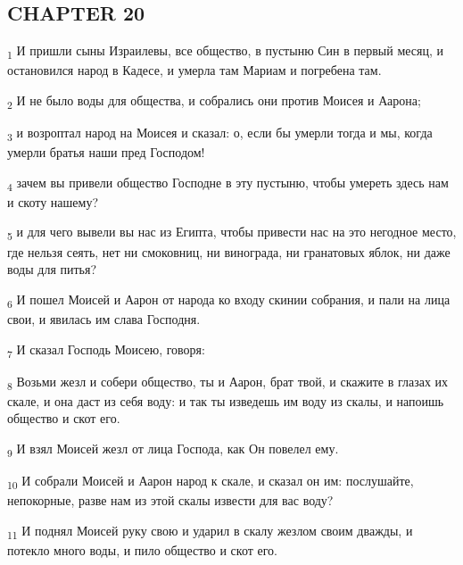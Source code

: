\subsection{CHAPTER 20}
\begin{tcolorbox}
\textsubscript{1} И пришли сыны Израилевы, все общество, в пустыню Син в первый месяц, и остановился народ в Кадесе, и умерла там Мариам и погребена там.
\end{tcolorbox}
\begin{tcolorbox}
\textsubscript{2} И не было воды для общества, и собрались они против Моисея и Аарона;
\end{tcolorbox}
\begin{tcolorbox}
\textsubscript{3} и возроптал народ на Моисея и сказал: о, если бы умерли тогда и мы, когда умерли братья наши пред Господом!
\end{tcolorbox}
\begin{tcolorbox}
\textsubscript{4} зачем вы привели общество Господне в эту пустыню, чтобы умереть здесь нам и скоту нашему?
\end{tcolorbox}
\begin{tcolorbox}
\textsubscript{5} и для чего вывели вы нас из Египта, чтобы привести нас на это негодное место, где нельзя сеять, нет ни смоковниц, ни винограда, ни гранатовых яблок, ни даже воды для питья?
\end{tcolorbox}
\begin{tcolorbox}
\textsubscript{6} И пошел Моисей и Аарон от народа ко входу скинии собрания, и пали на лица свои, и явилась им слава Господня.
\end{tcolorbox}
\begin{tcolorbox}
\textsubscript{7} И сказал Господь Моисею, говоря:
\end{tcolorbox}
\begin{tcolorbox}
\textsubscript{8} Возьми жезл и собери общество, ты и Аарон, брат твой, и скажите в глазах их скале, и она даст из себя воду: и так ты изведешь им воду из скалы, и напоишь общество и скот его.
\end{tcolorbox}
\begin{tcolorbox}
\textsubscript{9} И взял Моисей жезл от лица Господа, как Он повелел ему.
\end{tcolorbox}
\begin{tcolorbox}
\textsubscript{10} И собрали Моисей и Аарон народ к скале, и сказал он им: послушайте, непокорные, разве нам из этой скалы извести для вас воду?
\end{tcolorbox}
\begin{tcolorbox}
\textsubscript{11} И поднял Моисей руку свою и ударил в скалу жезлом своим дважды, и потекло много воды, и пило общество и скот его.
\end{tcolorbox}
